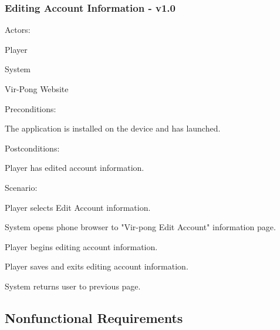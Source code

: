 \documentclass[12pt]{article}
\newenvironment{itemize*}%
  {\begin{itemize}%
  	\setlength{\parsep}{0pt}
    \setlength{\itemsep}{0pt}%
    \setlength{\parskip}{0pt}}%
  {\end{itemize}}
\newenvironment{enumerate*}%
  {\begin{enumerate}%
  	\setlength{\parsep}{0pt}
    \setlength{\itemsep}{0pt}%
    \setlength{\parskip}{0pt}}%
  {\end{enumerate}}
\begin{document}
\subsubsection*{Editing Account Information - v1.0}
Actors:
\begin{itemize*}
\item Player
\item System
\item Vir-Pong Website
\end{itemize*}
Preconditions:
\begin{itemize*}
\item The application is installed on the device and has launched.
\end{itemize*}
Postconditions:
\begin{itemize*}
\item Player has edited account information.
\end{itemize*}
Scenario:
\begin{enumerate*}
\item Player selects Edit Account information.
\item \label{Browser}System opens phone browser to "Vir-pong Edit Account" 
  information page. 
\item Player begins editing account information.
\item Player saves and exits editing account information.
\item System returns user to previous page.
\end{enumerate*} 

\onehalfspacing






\subsection{Nonfunctional Requirements}
\label{sec:nonfunctionalRequirements}
\end{document}
